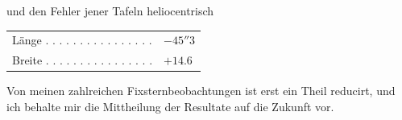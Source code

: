 \noindent und den Fehler jener Tafeln heliocentrisch

\begin{center}
\begin{tabular}{ll}
Länge . . . . . . . . . . . . . . . . & $-45''3$ \\
Breite . . . . . . . . . . . . . . . . & $+14.6$ \\
\end{tabular}
\end{center}

\par\indent Von meinen zahlreichen Fixsternbeobachtungen ist erst ein Theil reducirt, und ich behalte mir die Mittheilung der Resultate auf die Zukunft vor.
\clearpage
\endgroup
